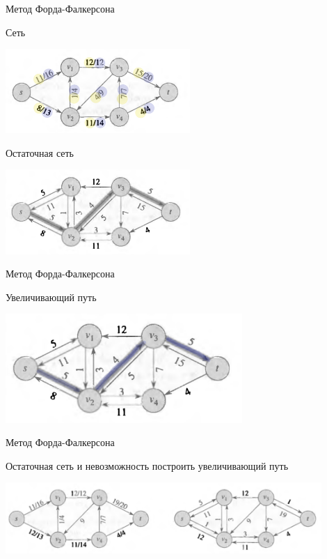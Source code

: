 \documentclass[10pt]{beamer}
\begin{document}
\begin{frame}[fragile]{Метод Форда-Фалкерсона}

Сеть 
\begin{center}
    \includegraphics[width=7cm]{Term_2/Source/images/8-flow-colors.png}
\end{center}

Остаточная сеть

\begin{center}
    \includegraphics[width=7cm]{Term_2/Source/images/8-flow-residual-network.png}
\end{center}

\end{frame}

\begin{frame}[fragile]{Метод Форда-Фалкерсона}

Увеличивающий путь

\begin{center}
    \includegraphics[width=9cm]{Term_2/Source/images/8-flow-augmenting-path.png}
\end{center}

\end{frame}

\begin{frame}[fragile]{Метод Форда-Фалкерсона}

Остаточная сеть и невозможность построить увеличивающий путь

\begin{center}
    \includegraphics[width=12cm]{Term_2/Source/images/8-flow-residual-network-no-way.png}
\end{center}

\end{frame}
\end{document}
